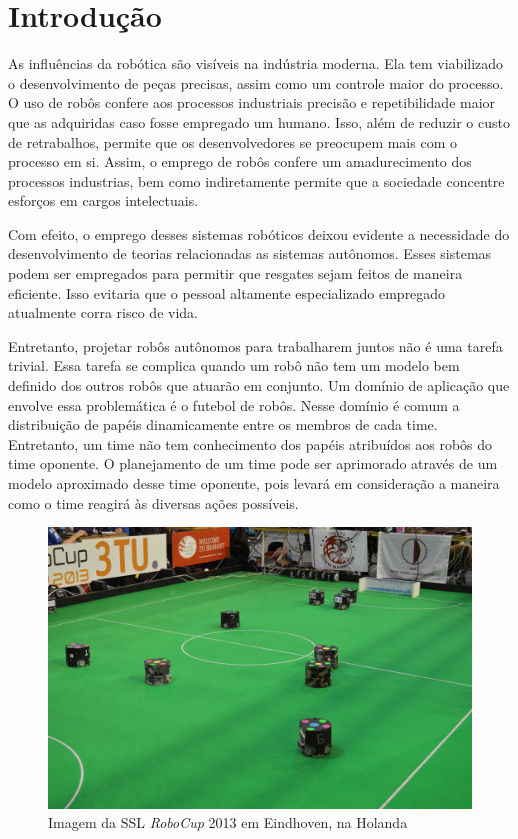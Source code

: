 \chapter{Introdução}


As influências da robótica
são visíveis na indústria moderna. Ela tem viabilizado o desenvolvimento de peças
precisas, assim como um controle maior do processo. O uso de robôs confere aos
processos industriais precisão e repetibilidade maior que as adquiridas caso
fosse empregado um humano. Isso, além de reduzir o custo de retrabalhos, permite
que os desenvolvedores se preocupem mais com o processo em si. Assim, o emprego
de robôs confere um amadurecimento dos processos industrias, bem como indiretamente
permite que a sociedade concentre esforços em cargos intelectuais.

Com efeito, o emprego desses sistemas robóticos deixou evidente a necessidade do
desenvolvimento de teorias relacionadas as sistemas autônomos. Esses sistemas podem
ser empregados para permitir que resgates sejam feitos de maneira eficiente. Isso
evitaria que o pessoal altamente especializado empregado atualmente corra risco de vida.

Entretanto, projetar robôs autônomos para trabalharem juntos não é uma tarefa trivial. Essa
tarefa se complica quando um robô não tem um modelo bem definido dos outros robôs que atuarão em
conjunto. Um domínio de aplicação que envolve essa problemática é o futebol de robôs.
Nesse domínio é comum a distribuição de papéis dinamicamente entre os membros de cada
time. Entretanto, um time não tem conhecimento dos papéis atribuídos aos robôs
do time oponente. O planejamento de um time pode ser aprimorado através de um modelo
aproximado desse time oponente, pois levará em consideração a maneira como o
time reagirá às diversas ações possíveis.

\begin{figure}
  \includegraphics[width = \linewidth]{figuras/robocup2013}
  \caption{Imagem da SSL \textit{RoboCup} 2013 em Eindhoven, na Holanda}\label{fig:robocup2013}
\end{figure}

